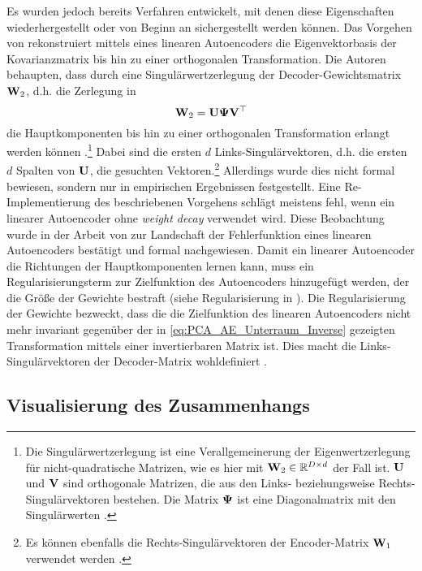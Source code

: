 Es wurden jedoch bereits Verfahren entwickelt, mit denen diese Eigenschaften wiederhergestellt oder
von Beginn an sichergestellt werden können. Das Vorgehen von \textcite{Plaut.2018} rekonstruiert
mittels eines linearen Autoencoders die Eigenvektorbasis der Kovarianzmatrix bis hin zu einer
orthogonalen Transformation. Die Autoren behaupten, dass durch eine Singulärwertzerlegung der
Decoder-Gewichtsmatrix $\mathbf{W}_2$, d.h. die Zerlegung in
\begin{equation}
	\label{eq:SVD}
	\mathbf{W}_2 = \mathbf{U} \mathbf{\Psi} \mathbf{V}^\top
\end{equation}
die Hauptkomponenten bis hin zu einer orthogonalen Transformation erlangt werden können \parencite[4]{Plaut.2018}.\footnote{Die Singulärwertzerlegung ist eine Verallgemeinerung der
	Eigenwertzerlegung für nicht-quadratische Matrizen, wie es hier mit $\mathbf{W}_2 \in \mathbb{R}^{D \times
			d}$ der Fall ist. $\mathbf{U}$ und $\mathbf{V}$ sind orthogonale Matrizen, die aus den Links-
	beziehungsweise Rechts-Singulärvektoren bestehen. Die Matrix $\mathbf{\Psi}$ ist eine Diagonalmatrix
	mit den Singulärwerten \parencite[44 -- 45]{Goodfellow.2016}. } Dabei sind die ersten $d$ Links-Singulärvektoren, d.h. die
ersten $d$ Spalten von $\mathbf{U}$, die gesuchten Vektoren.\footnote{Es können ebenfalls die
	Rechts-Singulärvektoren der Encoder-Matrix $\mathbf{W}_1$ verwendet werden \parencite[4]{Plaut.2018}.} Allerdings wurde dies nicht formal bewiesen, sondern nur in empirischen
Ergebnissen festgestellt. Eine Re-Implementierung des beschriebenen Vorgehens schlägt meistens
fehl, wenn ein linearer Autoencoder ohne \textit{weight decay} verwendet wird. Diese Beobachtung
wurde in der Arbeit von \textcite{Kunin.2019} zur Landschaft der Fehlerfunktion eines linearen
Autoencoders bestätigt und formal nachgewiesen. Damit ein linearer Autoencoder die Richtungen der
Hauptkomponenten lernen kann, muss ein Regularisierungsterm zur Zielfunktion des Autoencoders
hinzugefügt werden, der die Größe der Gewichte bestraft (siehe Regularisierung in
). Die Regularisierung der Gewichte bezweckt, dass die die
Zielfunktion des linearen Autoencoders nicht mehr invariant gegenüber der in
\eqref{eq:PCA_AE_Unterraum_Inverse} gezeigten Transformation mittels einer invertierbaren Matrix
ist. Dies macht die Links-Singulärvektoren der Decoder-Matrix wohldefiniert \parencite[3]{Kunin.2019}.

\subsection{Visualisierung des Zusammenhangs}

